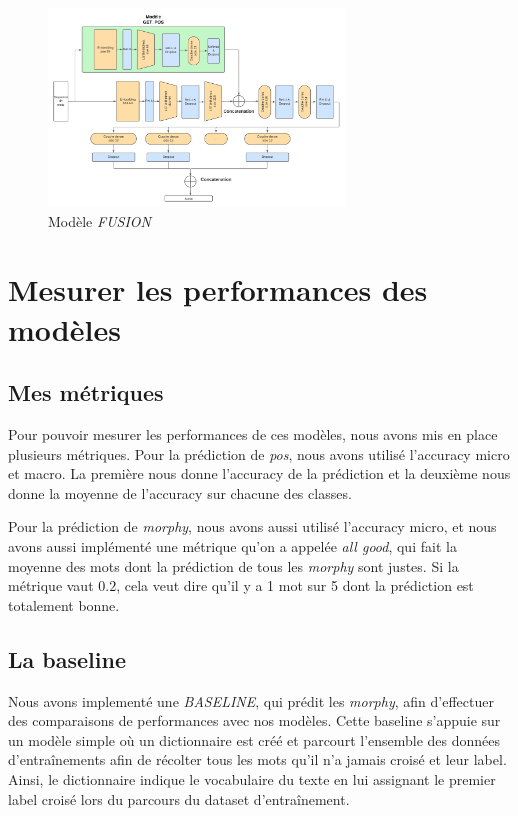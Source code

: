 \documentclass[a4paper]{article}
\begin{document}
\begin{figure}[H]
    \centering
    \includegraphics[width=0.7\textwidth]{get_morphy_fusion.png}
    \caption{Modèle \textit{FUSION}}
    \label{fig: model fusion}
\end{figure}


\section{Mesurer les performances des modèles}

\subsection{Mes métriques}

Pour pouvoir mesurer les performances de ces modèles, nous avons mis en place plusieurs métriques. Pour la prédiction de 
\textit{pos}, nous avons utilisé l'accuracy micro et macro. La première nous donne l'accuracy de la prédiction et la deuxième
nous donne la moyenne de l'accuracy sur chacune des classes. 

Pour la prédiction de \textit{morphy}, nous avons aussi utilisé l'accuracy micro, et nous avons aussi implémenté une 
métrique qu'on a appelée \textit{all good}, qui fait la moyenne des mots dont la prédiction de tous les \textit{morphy}
sont justes. Si la métrique vaut $0.2$, cela veut dire qu'il y a 1 mot sur 5 dont la prédiction est totalement bonne.

\subsection{La baseline}

Nous avons implementé une \textit{BASELINE}, qui prédit les \textit{morphy}, afin d'effectuer des comparaisons de performances avec nos modèles.
Cette baseline s'appuie sur un modèle simple où un dictionnaire est créé et parcourt l'ensemble des données d'entraînements afin de 
récolter tous les mots qu'il n'a jamais croisé et leur label. Ainsi, le dictionnaire indique le vocabulaire du texte en lui assignant
le premier label croisé lors du parcours du dataset d'entraînement.
\end{document}

